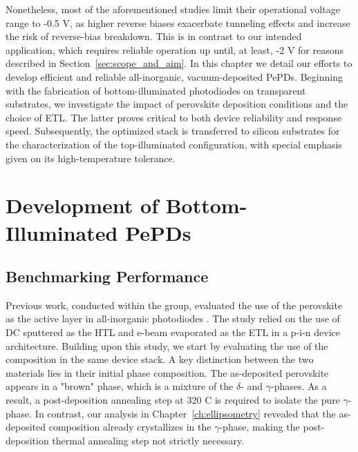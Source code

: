 Nonetheless, most of the aforementioned studies limit their operational voltage range to -0.5 V, as higher reverse biases exacerbate tunneling effects and increase the risk of reverse-bias breakdown. This is in contrast to our intended application, which requires reliable operation up until, at least, -2 V for reasons described in Section~\ref{sec:scope_and_aim}. In this chapter we detail our efforts to develop efficient and reliable all-inorganic, vacuum-deposited PePDs. Beginning with the fabrication of bottom-illuminated photodiodes on transparent substrates, we investigate the impact of perovskite deposition conditions and the choice of ETL. The latter proves critical to both device reliability and response speed. Subsequently, the optimized stack is transferred to silicon substrates for the characterization of the top-illuminated configuration, with special emphasis given on its high-temperature tolerance.


\section{Development of Bottom-Illuminated PePDs}

\subsection{Benchmarking Performance}

Previous work, conducted within the group, evaluated the use of the  perovskite as the active layer in all-inorganic photodiodes \cite{PintorMonroy2021All-EvaporatedApplications}. The study relied on the use of DC sputtered  as the HTL and e-beam evaporated  as the ETL in a p-i-n  device architecture. Building upon this study, we start by evaluating the use of the  composition in the same device stack. A key distinction between the two materials lies in their initial phase composition. The as-deposited  perovskite appears in a "brown" phase, which is a mixture of the $\delta$- and $\gamma$-phases. As a result, a post-deposition annealing step at 320 \degree C is required to isolate the pure $\gamma$-phase. In contrast, our analysis in Chapter~\ref{ch:ellipsometry} revealed that the as-deposited  composition already crystallizes in the $\gamma$-phase, making the post-deposition thermal annealing step not strictly necessary. 

